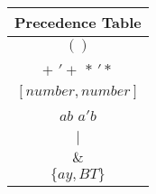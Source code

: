 \begin{tabular}{ |c| }
    \hline
    \textbf{Precedence Table} \\
    \hline
    $()$ \\
    \hline
    $+$ \quad $'+$ \quad $*$ \quad $'*$ \\
    \hline
    $[number,number]$ \\
    \hline
    $ab$ \quad $a'b$ \\
    \hline
    $|$ \\
    \hline
    $\&$ \\
    \hline
    $\{ay,BT\}$ \\
    \hline
\end{tabular}